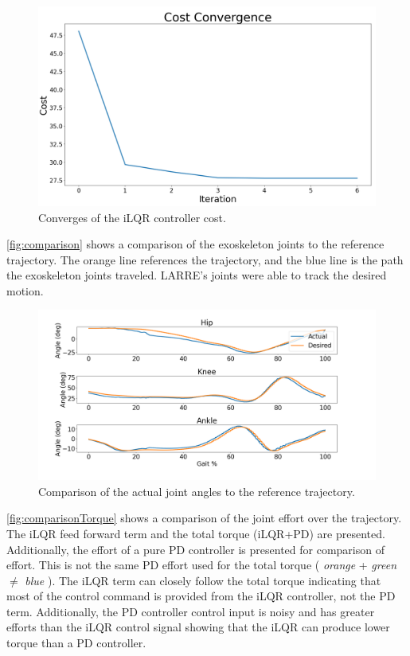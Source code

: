 \begin{figure}[h!]
    \centering
    \includegraphics[scale=0.22]{images/controllers/Cost_plt3.png}
    \caption[iLQR controller Convergence]{Converges of the iLQR controller cost.}
    \label{fig:cost}
\end{figure}


\autoref{fig:comparison} shows a comparison of the exoskeleton joints to the reference trajectory. The orange line references the trajectory, and the blue line is the path the exoskeleton joints traveled. LARRE's joints were able to track the desired motion. 


\begin{figure}[h!]
    \centering
    \includegraphics[scale=0.27]{images/controllers/compare_traj.png}
    \caption[iLQR controller trajectory]{Comparison of the actual joint angles to the reference trajectory.}
    \label{fig:comparison}
\end{figure}


\autoref{fig:comparisonTorque} shows a comparison of the joint effort over the trajectory. The iLQR feed forward term and the total torque (iLQR+PD) are presented. Additionally, the effort of a pure PD controller is presented for comparison of effort. This is not the same PD effort used for the total torque ( \textit{orange} +  \textit{green} $\neq$  \textit{blue} ). The iLQR term can closely follow the total torque indicating that most of the control command is provided from the iLQR controller, not the PD term. Additionally, the PD controller control input is noisy and has greater efforts than the iLQR control signal showing that the iLQR can produce lower torque than a PD controller. 

